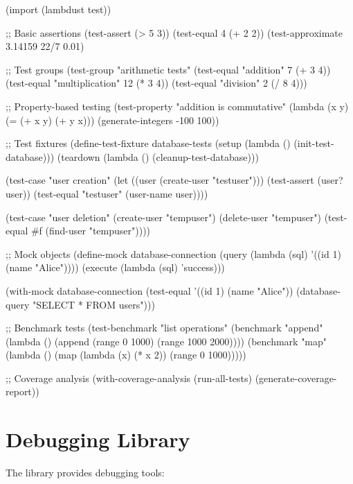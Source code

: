 \begin{example}
\begin{lambdustcode}
(import (lambdust test))

;; Basic assertions
(test-assert (> 5 3))
(test-equal 4 (+ 2 2))
(test-approximate 3.14159 22/7 0.01)

;; Test groups
(test-group "arithmetic tests"
  (test-equal "addition" 7 (+ 3 4))
  (test-equal "multiplication" 12 (* 3 4))
  (test-equal "division" 2 (/ 8 4)))

;; Property-based testing
(test-property "addition is commutative"
  (lambda (x y) (= (+ x y) (+ y x)))
  (generate-integers -100 100))

;; Test fixtures
(define-test-fixture database-tests
  (setup (lambda () (init-test-database)))
  (teardown (lambda () (cleanup-test-database)))
  
  (test-case "user creation"
    (let ((user (create-user "testuser")))
      (test-assert (user? user))
      (test-equal "testuser" (user-name user))))
  
  (test-case "user deletion"
    (create-user "tempuser")
    (delete-user "tempuser")
    (test-equal #f (find-user "tempuser"))))

;; Mock objects
(define-mock database-connection
  (query (lambda (sql) '((id 1) (name "Alice"))))
  (execute (lambda (sql) 'success)))

(with-mock database-connection
  (test-equal '((id 1) (name "Alice"))
              (database-query "SELECT * FROM users")))

;; Benchmark tests
(test-benchmark "list operations"
  (benchmark "append" (lambda () (append (range 0 1000) (range 1000 2000))))
  (benchmark "map" (lambda () (map (lambda (x) (* x 2)) (range 0 1000)))))

;; Coverage analysis
(with-coverage-analysis
  (run-all-tests)
  (generate-coverage-report))
\end{lambdustcode}
\end{example}

\section{Debugging Library}
\label{sec:debugging-library}


The  library provides debugging tools:

